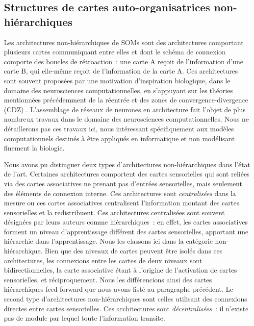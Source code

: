 \documentclass[../main]{subfiles}
\begin{document}

\subsection{Structures de cartes auto-organisatrices non-hiérarchiques}

Les architectures non-hiérarchiques de SOMs sont des architectures comportant plusieurs cartes communiquant entre elles et dont le schéma de connexion comporte des boucles de rétroaction~: une carte A reçoit de l'information d'une carte B, qui elle-même reçoit de l'information de la carte A.
Ces architectures sont souvent proposées par une motivation d'inspiration biologique, dans le domaine des neurosciences computationnelles, en s'appuyant sur les théories mentionnées précédemment de la réentrée \cite{Edelman1982GroupSA} et des zones de convergence-divergence (CDZ) \cite{damasio_time-locked_1989}.
L'assemblage de réseaux de neurones en architecture fait l'objet de plus nombreux travaux dans le domaine des neurosciences computationnelles. Nous ne détaillerons pas ces travaux ici, nous intéressant spécifiquement aux modèles computationnels destinés à être appliqués en informatique et non modélisant finement la biologie.

Nous avons pu distinguer deux types d'architectures non-hiérarchiques dans l'état de l'art.
Certaines architectures comportent des cartes sensorielles qui sont reliées via des cartes associatives ne prenant pas d'entrées sensorielles, mais seulement des éléments de connexion interne. Ces architectures sont \emph{centralisées} dans la mesure ou ces cartes associatives centralisent l'information  montant des cartes sensorielles et la redistribuent. Ces architectures centralisées sont souvent désignées par leurs auteurs comme hiérarchiques~: en effet, les cartes associatives forment un niveau d'apprentissage différent des cartes sensorielles, apportant une hiérarchie dans l'apprentissage. Nous les classons ici dans la catégorie non-hiérarchique. Bien que des niveaux de cartes peuvent être isolés dans ces architectures, les connexions entre les cartes de deux niveaux sont bidirectionnelles, la carte associative étant à l'origine de l'activation de cartes sensorielles, et réciproquement.
Nous les différencions ainsi des cartes hiérarchiques feed-forward que nous avons listé au paragraphe précédent.
Le second type d'architectures non-hiérarchiques sont celles utilisant des connexions directes entre cartes sensorielles. Ces architectures sont \emph{décentralisées}~: il n'existe pas de module par lequel toute l'information transite.
\end{document}
